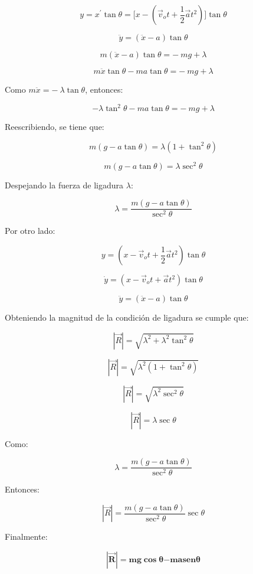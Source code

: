 \documentclass[]{article}
\begin{document}
\[y = x^{'}\tan\theta = \lbrack x - \left( {\overrightarrow{v}}_{o}t + \frac{1}{2}\overrightarrow{a}t^{2} \right)\rbrack\tan\theta\]

\[\ddot{y} = \left( \ddot{x} - a \right)\tan\theta\]

\[m\left( \ddot{x} - a \right)\tan\theta = - \ mg + \lambda\]

\[m\ddot{x}\tan\theta - ma\tan\theta = - \ mg + \lambda\]

Como \(m\ddot{x} = - \ \lambda\tan\theta\), entonces:

\[- \lambda\tan^{2}\theta - ma\tan\theta = - \ mg + \lambda\]

Reescribiendo, se tiene que:

\[m\left( g - a\tan\theta \right) = \lambda\left( 1 + \tan^{2}\theta \right)\]

\[m\left( g - a\tan\theta \right) = \lambda\sec^{2}\theta\]

Despejando la fuerza de ligadura \(\lambda:\)

\[\lambda = \frac{m\left( g - a\tan\theta \right)}{\sec^{2}\theta}\]

Por otro lado:

\[y = \left( x - {\overrightarrow{v}}_{o}t + \frac{1}{2}\overrightarrow{a}t^{2} \right)\tan\theta\]

\[\dot{y} = \left( x - {\overrightarrow{v}}_{o}t + \overrightarrow{a}t^{2} \right)\tan\theta\]

\[\ddot{y} = \left( \ddot{x} - a \right)\tan\theta\]

Obteniendo la magnitud de la condición de ligadura se cumple que:

\[\left| \overrightarrow{R} \right| = \sqrt{\lambda^{2} + \lambda^{2}\tan^{2}\theta}\]

\[\left| \overrightarrow{R} \right| = \sqrt{\lambda^{2}(1 + \tan^{2}\theta)}\]

\[\left| \overrightarrow{R} \right| = \sqrt{\lambda^{2}\sec^{2}\theta}\]

\[\left| \overrightarrow{R} \right| = \lambda\sec\theta\]

Como:

\[\lambda = \frac{m\left( g - a\tan\theta \right)}{\sec^{2}\theta}\]

Entonces:

\[\left| \overrightarrow{R} \right| = {\frac{m\left( g - a\tan\theta \right)}{\sec^{2}\theta}\sec}\theta\]

Finalmente:

\[\left| \overrightarrow{\mathbf{R}} \right|\mathbf{= mg}\mathbf{\cos}\mathbf{\theta}\mathbf{- ma}\mathbf{sen}\mathbf{\theta}\]
\end{document}
